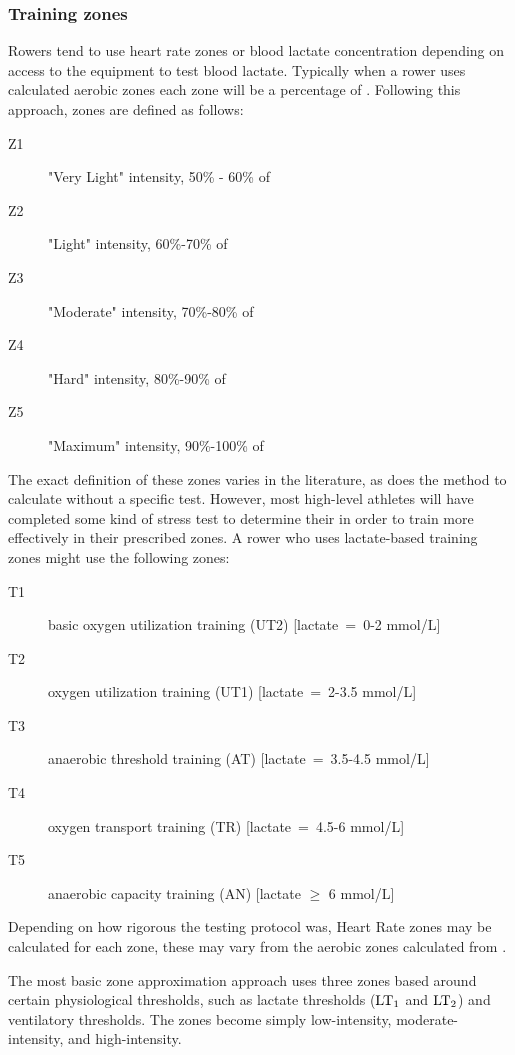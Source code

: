 \subsubsection{Training zones}
Rowers tend to use heart rate zones or blood lactate concentration depending on access to the equipment to test blood lactate. Typically when a rower uses calculated aerobic zones each zone will be a percentage of \maxHR. Following this approach, zones are defined as follows:
\begin{description}
  \item[Z1] "Very Light" intensity, 50\% - 60\% of \maxHR
  \item[Z2] "Light" intensity, 60\%-70\% of \maxHR
  \item[Z3] "Moderate" intensity, 70\%-80\% of \maxHR
  \item[Z4] "Hard" intensity, 80\%-90\% of \maxHR
  \item[Z5] "Maximum" intensity, 90\%-100\% of \maxHR
\end{description}
The exact definition of these zones varies in the literature, as does the method to calculate \maxHR without a specific test. However, most high-level athletes will have completed some kind of stress test to determine their \maxHR in order to train more effectively in their prescribed zones.
A rower who uses lactate-based training zones might use the following zones:
\begin{description}
  \item[T1]  basic oxygen utilization training (UT2) [lactate~=~0-2 mmol/L]
  \item[T2]  oxygen utilization training (UT1) [lactate~=~2-3.5 mmol/L]
  \item[T3]  anaerobic threshold training (AT) [lactate~=~3.5-4.5 mmol/L]
  \item[T4]  oxygen transport training (TR) [lactate~=~4.5-6 mmol/L]
  \item[T5]  anaerobic capacity training (AN) [lactate $\geq$ 6 mmol/L] \autocite{Das2022}
\end{description}
Depending on how rigorous the testing protocol was, Heart Rate zones may be calculated for each zone, these may vary from the aerobic zones calculated from \maxHR.

The most basic zone approximation approach uses three zones based around certain physiological thresholds, such as lactate thresholds ($\textnormal{LT}_\text{1}$ and $\textnormal{LT}_\text{2}$) and ventilatory thresholds. The zones become simply low-intensity, moderate-intensity, and high-intensity. 

